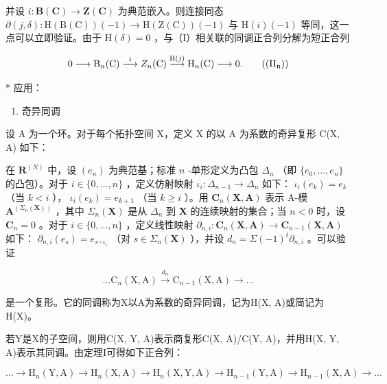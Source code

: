 并设 \(i: \mathbf{B}(\mathbf{C}) \to \mathbf{Z}(\mathbf{C})\) 为典范嵌入。则连接同态 \(\partial(j, \delta): \mathrm{H}(\mathrm{B}(\mathrm{C})) (-1) \to \mathrm{H}(\mathrm{Z}(\mathrm{C})) (-1)\) 与 \(\mathrm{H}(i) (-1)\) 等同，这一点可以立即验证。由于 \(\mathrm{H}(\delta) = 0\) ，与（I）相关联的同调正合列分解为短正合列

\[
0 \longrightarrow \mathrm{B} _ {n} (\mathrm{C}) \stackrel {i} {\longrightarrow} Z _ {n} (\mathrm{C}) \stackrel {\mathrm{H} (j)} {\longrightarrow} \mathrm{H} _ {n} (\mathrm{C}) \longrightarrow 0.\tag{\((\mathrm{II}_{\mathfrak{n}})\)}
\]

* 应用：

\begin{enumerate}
\def\labelenumi{\arabic{enumi})}
\tightlist
\item
  奇异同调
\end{enumerate}

设 A 为一个环。对于每个拓扑空间 X，定义 X 的以 A 为系数的奇异复形 C(X, A) 如下：

在 \(\mathbf{R}^{(N)}\) 中，设 \((e_n)\) 为典范基；标准 \(n\) -单形定义为凸包 \(\Delta_n\) （即 \(\{e_0, \ldots, e_n\}\) 的凸包）。对于 \(i \in \{0, \ldots, n\}\) ，定义仿射映射 \(\iota_i: \Delta_{n-1} \to \Delta_n\) 如下： \(\iota_i(e_k) = e_k\) （当 \(k < i\) ）， \(\iota_i(e_k) = e_{k+1}\) （当 \(k \geqslant i\) ）。用 \(\mathbf{C}_n(\mathbf{X}, \mathbf{A})\) 表示 A-模 \(\mathbf{A}^{(\Sigma_n(\mathbf{X}))}\) ，其中 \(\Sigma_n(\mathbf{X})\) 是从 \(\Delta_n\) 到 \(\mathbf{X}\) 的连续映射的集合；当 \(n < 0\) 时，设 \(\mathbf{C}_n = 0\) 。对于 \(i \in \{0, \ldots, n\}\) ，定义线性映射 \(\partial_{n,i}: \mathbf{C}_n(\mathbf{X}, \mathbf{A}) \to \mathbf{C}_{n-1}(\mathbf{X}, \mathbf{A})\) 如下： \(\partial_{n,i}(e_s) = e_{s \circ \iota_i}\) （对 \(s \in \Sigma_n(\mathbf{X})\) ），并设 \(d_n = \Sigma (-1)^t \partial_{n,i}\) 。可以验证

\[
\dots \mathrm{C} _ {n} (\mathrm{X}, \mathrm{A}) \xrightarrow {d _ {n}} \mathrm{C} _ {n - 1} (\mathrm{X}, \mathrm{A}) \rightarrow \dots
\]

是一个复形。它的同调称为X以A为系数的奇异同调，记为H(X, A)或简记为H(X)。

若Y是X的子空间，则用C(X, Y, A)表示商复形C(X, A)/C(Y, A)，并用H(X, Y, A)表示其同调。由定理I可得如下正合列：

\[
\dots \rightarrow \mathrm{H} _ {n} (\mathrm{Y}, \mathrm{A}) \rightarrow \mathrm{H} _ {n} (\mathrm{X}, \mathrm{A}) \rightarrow \mathrm{H} _ {n} (\mathrm{X}, \mathrm{Y}, \mathrm{A}) \rightarrow \mathrm{H} _ {n - 1} (\mathrm{Y}, \mathrm{A}) \rightarrow \mathrm{H} _ {n - 1} (\mathrm{X}, \mathrm{A}) \rightarrow \dots
\]

